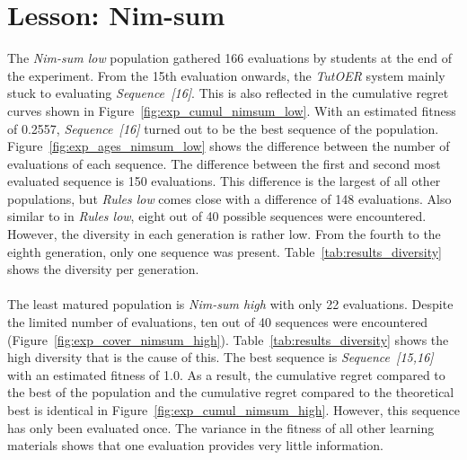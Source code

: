 \section{Lesson: Nim-sum}
\label{sec:results_nimsum}
The \emph{Nim-sum low} population gathered 166 evaluations by students at the
end of the experiment. From the 15th evaluation onwards, the \emph{TutOER}
system mainly stuck to evaluating \emph{Sequence~[16]}. This is also reflected
in the cumulative regret curves shown in Figure~\ref{fig:exp_cumul_nimsum_low}.
With an estimated fitness of 0.2557, \emph{Sequence~[16]} turned out to be the
best sequence of the population. Figure~\ref{fig:exp_ages_nimsum_low} shows the
difference between the number of evaluations of each sequence. The difference
between the first and second most evaluated sequence is 150 evaluations. This
difference is the largest of all other populations, but \emph{Rules low} comes
close with a difference of 148 evaluations. Also similar to in \emph{Rules
low}, eight out of 40 possible sequences were encountered. However, the
diversity in each generation is rather low. From the fourth to the eighth
generation, only one sequence was present. Table~\ref{tab:results_diversity}
shows the diversity per generation.\\\\
\noindent
The least matured population is \emph{Nim-sum high} with only 22 evaluations.
Despite the limited number of evaluations, ten out of 40 sequences were
encountered (Figure~\ref{fig:exp_cover_nimsum_high}).
Table~\ref{tab:results_diversity} shows the high diversity that is the cause of
this. The best sequence is \emph{Sequence~[15,16]} with an estimated fitness of
1.0. As a result, the cumulative regret compared to the best of the population
and the cumulative regret compared to the theoretical best is identical in
Figure~\ref{fig:exp_cumul_nimsum_high}. However, this sequence has only been
evaluated once. The variance in the fitness of all other learning materials
shows that one evaluation provides very little information.
